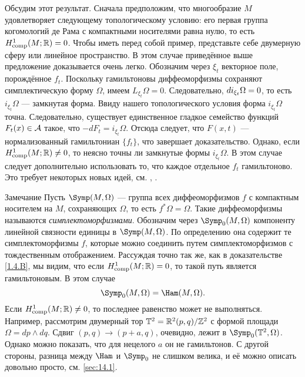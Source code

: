 Обсудим этот результат.
Сначала предположим, что многообразие $M$ удовлетворяет следующему
топологическому условию: его первая группа когомологий де Рама с компактными носителями равна нулю, то есть $H_{\mathrm{comp}}^1(M;\mathbb{R}) = 0$.
Чтобы иметь перед собой пример, представьте себе двумерную сферу или линейное пространство.
В этом случае приведённое выше предложение доказывается очень легко.
Обозначим через $\xi_t$ векторное поле, порождённое $f_t$.
Поскольку гамильтоновы диффеоморфизмы сохраняют симплектическую форму $\Omega$, имеем $L_{\xi_t} \Omega = 0$.
Следовательно, $d i_{\xi_t} \Omega = 0$, то есть $i_{\xi_t} \Omega$ — замкнутая форма.
Ввиду нашего топологического условия форма $i_{\xi_t} \Omega$ точна.
Следовательно, существует единственное гладкое семейство функций $F_t (x) \in \mathcal{A}$ такое, что $-dF_t = i_{\xi_t} \Omega$.
Отсюда следует, что $F (x, t)$ — нормализованный гамильтониан $\{f_t\}$, что завершает доказательство.
Однако, если $H^1_{\mathrm{comp}} (M;\mathbb{R}) \ne 0$, то неясно точны ли замкнутые формы $i_{\xi_t} \Omega$.
В этом случае следует дополнительно использовать то, что каждое отдельное $f_t$ гамильтоново.
Это требует некоторых новых идей, см. \cite{B1}, \cite{MS}.

{\sloppy 

\begin{ex}{Замечание}\label{1.4.C}
Пусть $\Symp(M,\Omega)$ — группа всех диффеоморфизмов $f$ с компактным носителем на $M$, сохраняющих $\Omega$, то есть $f^\ast\Omega = \Omega$.
Такие диффеоморфизмы называются \emph{симплектоморфизмами}.
Обозначим через $\Symp_0(M,\Omega)$ компоненту линейной связности единицы в $\Symp(M,\Omega)$.
По определению она содержит те симплектоморфизмы $f$, которые можно соединить путем симплектоморфизмов с тождественным отображением.
Рассуждая точно так же, как в доказательстве \ref{1.4.B}, мы видим, что если $H^1_{\mathrm{comp}} (M;\mathbb{R}) = 0$, то такой путь является гамильтоновым.
В этом случае
\[\Symp_0 (M, \Omega) = \Ham (M, \Omega).\]
Если $H^1_{\mathrm{comp}} (M;\mathbb{R}) \ne 0$, то последнее равенство может не выполняться.
Например, рассмотрим двумерный тор $\mathbb{T}^2=\mathbb{R}^2(p,q)/\mathbb{Z}^2$ с формой площади $\Omega = dp \wedge dq$.
Сдвиг $(p, q) \to (p + a, q)$, очевидно, лежит в $\Symp_0 (\TT^2, \Omega)$.
Однако можно показать, что для нецелого $a$ он не гамильтонов.
С другой стороны, разница между $\Ham$ и $\Symp_0$ не слишком велика, и её можно описать довольно просто, см. \ref{sec:14.1}.
\end{ex}

}


